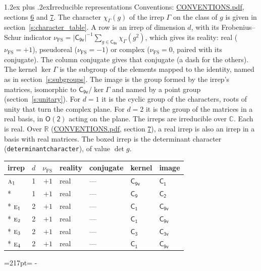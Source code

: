 \documentclass[10pt,a4paper]{article}
\makeatletter
\renewcommand\section{\@startsection{section}{1}{\z@}{-3ex plus -1ex minus -.2ex}%
  {1.2ex plus .2ex}{\normalfont\large\sffamily\bfseries\color{parttitle}}}
\newcommand{\needspace}[1]{\par\penalty-100\begingroup\dimen0=#1\relax\dimen2=\pagegoal
  \advance\dimen2-\pagetotal\ifdim\dimen0>\dimen2\relax\ifdim\dimen2>0pt\vfil\break\fi\fi
  \endgroup}
\numberwithin{equation}{section}
\newcommand{\grp}[1]{\mathsf{#1}}
\newcommand{\irr}[1]{\text{\normalfont\scshape #1}}
\newcommand{\detbox}[1]{{\setlength{\fboxsep}{1pt}\fbox{#1}}}
\newcommand{\irchar}[1]{\chi_{#1}}
\newcommand{\fsind}{\nu_{\mathrm{FS}}}
\makeatother
\begin{document}
\section{Irreducible representations}\label{s:irreps}
Conventions: \href{../../CONVENTIONS.pdf}{CONVENTIONS.pdf}, sections \href{../../CONVENTIONS.pdf\#conv.6}{6} and \href{../../CONVENTIONS.pdf\#conv.7}{7}.
\leavevmode\label{n:function.character}\label{n:irrep.Gamma}The character $\irchar{\Gamma}(g)$ of the irrep $\Gamma$ on the class of $g$ is given in section~\ref{s:character_table}.
\leavevmode\label{n:index.dimension}\label{n:index.frobenius}\label{n:head.irrep}\label{n:head.reality}A row is an irrep of dimension $d$, with its Frobenius--Schur indicator $\fsind = |\grp{C_{9v}}|^{-1}\allowbreak\sum_{g\in\grp{C_{9v}}}\irchar{\Gamma}(g^2)$, which gives its reality: real ($\fsind = +1$), pseudoreal ($\fsind = -1$) or complex ($\fsind = 0$, paired with its conjugate). \label{n:head.conjugate}The column conjugate gives that conjugate (a dash for the others). \label{n:head.kernel}The kernel $\ker\Gamma$ is the subgroup of the elements mapped to the identity, named as in section~\ref{s:subgroups}. \label{n:head.image}The image is the group formed by the irrep's matrices, isomorphic to $\grp{C_{9v}}/\ker\Gamma$ and named by a point group (section~\ref{s:unitary}). For $d = 1$ it is the cyclic group of the characters, roots of unity that turn the complex plane. For $d = 2$ it is the group of the matrices in a real basis, in $\grp{O(2)}$ acting on the plane. The irreps are irreducible over $\mathbb{C}$. Each is real. Over $\mathbb{R}$ (\href{../../CONVENTIONS.pdf}{CONVENTIONS.pdf}, section \href{../../CONVENTIONS.pdf\#conv.7}{7}), a real irrep is also an irrep in a basis with real matrices. \label{n:mark.determinant}The boxed irrep is the determinant character (\texttt{determinantcharacter}), of value $\det g$.
\setlength{\emergencystretch}{2em}\par\setlength{\emergencystretch}{0pt}
{\small\renewcommand{\arraystretch}{1.25}\begin{longtable}{@{}lrrllll@{}}\toprule
irrep & $d$ & $\fsind$ & reality & conjugate & kernel & image\\\midrule\endhead
\bottomrule\endfoot\endlastfoot
$\irr{a}_{1}$ & 1 & $+1$ & real & --- & \href{C9v.pdf}{$\grp{C_{9v}}$} & \href{C1.pdf}{$\grp{C_{1}}$}\\*
\detbox{$\irr{a}_{2}$} & 1 & $+1$ & real & --- & \href{C9.pdf}{$\grp{C_{9}}$} & \href{C2.pdf}{$\grp{C_{2}}$}\\*
$\irr{e}_{1}$ & 2 & $+1$ & real & --- & \href{C1.pdf}{$\grp{C_{1}}$} & \href{C9v.pdf}{$\grp{C_{9v}}$}\\*
$\irr{e}_{2}$ & 2 & $+1$ & real & --- & \href{C1.pdf}{$\grp{C_{1}}$} & \href{C9v.pdf}{$\grp{C_{9v}}$}\\*
$\irr{e}_{3}$ & 2 & $+1$ & real & --- & \href{C3.pdf}{$\grp{C_{3}}$} & \href{C3v.pdf}{$\grp{C_{3v}}$}\\*
$\irr{e}_{4}$ & 2 & $+1$ & real & --- & \href{C1.pdf}{$\grp{C_{1}}$} & \href{C9v.pdf}{$\grp{C_{9v}}$}\\
\bottomrule\end{longtable}}
\needspace{217pt}
\end{document}
